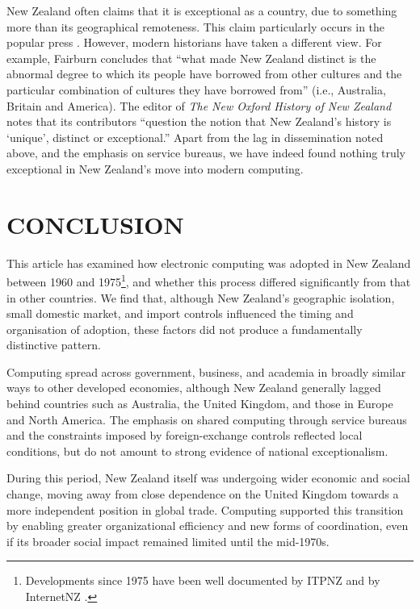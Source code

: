 \documentclass{IEEEcsmag}
\begin{document}
New Zealand often claims that it is exceptional as a country, due to something more than its geographical remoteness. This claim particularly occurs in the popular press \cite{Frykberg-2025}. However, modern historians have taken a different view. For example, Fairburn \cite{Fairburn-2008} concludes that “what made New Zealand distinct is the
abnormal degree to which its people have borrowed from other cultures and
the particular combination of cultures they have borrowed from” (i.e., Australia, Britain and America). The editor of \textit{The New Oxford History of New Zealand} notes that its contributors “question the notion that New Zealand’s history is ‘unique’, distinct or exceptional.” \cite{Byrnes-2007} Apart from the lag in dissemination noted above, and the emphasis on service bureaus, we have indeed found nothing truly exceptional in New Zealand’s move into modern computing.
\cbend
\vspace*{-8pt}
\section{CONCLUSION}
\cbstart
This article has examined how electronic computing was adopted in New Zealand between 1960 and 1975\footnote{Developments since 1975 have been well documented by ITPNZ \cite{ITPNZ} and by InternetNZ \cite{ConnectingClouds}.}, and whether this process differed significantly from that in other countries. We find that, although New Zealand's geographic isolation, small domestic market, and import controls influenced the timing and organisation of adoption, these factors did not produce a fundamentally distinctive pattern.

Computing spread across government, business, and academia in broadly similar ways to other developed economies, although New Zealand generally lagged behind countries such as Australia, the United Kingdom, and those in Europe and North America. The emphasis on shared computing through service bureaus and the constraints imposed by foreign-exchange controls reflected local conditions, but do not amount to strong evidence of national exceptionalism.

During this period, New Zealand itself was undergoing wider economic and social change, moving away from close dependence on the United Kingdom towards a more independent position in global trade. Computing supported this transition by enabling greater organizational efficiency and new forms of coordination, even if its broader social impact remained limited until the mid-1970s.
\end{document}

